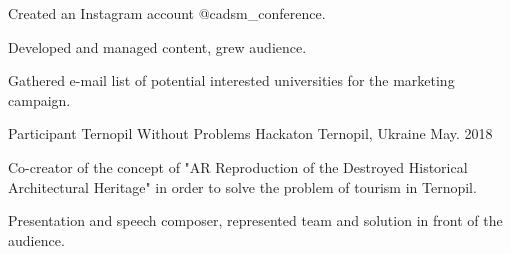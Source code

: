 \begin{cventries}
    {
      \begin{cvitems} %
        \item {Created an Instagram account @cadsm\_conference.}
        \item {Developed and managed content, grew audience.}
        \item {Gathered e-mail list of potential interested universities for the marketing campaign.}
      \end{cvitems}
    }
  \cventry
    {Participant} %
    {Ternopil Without Problems Hackaton} %
    {Ternopil, Ukraine} %
    {May. 2018} %
    {
      \begin{cvitems} %
        \item {Co-creator of the concept of "AR Reproduction of the Destroyed Historical Architectural Heritage" in order to solve the problem of tourism in Ternopil.}
        \item {Presentation and speech composer, represented team and solution in front of the audience.}
      \end{cvitems}
    }
\end{cventries}
